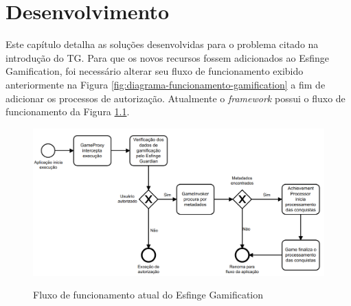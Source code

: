 \newpage
\chapter{Desenvolvimento}
\label{ch:desenvolvimento}




\par Este capítulo detalha as soluções desenvolvidas para o problema citado na introdução do TG. Para que os novos recursos fossem adicionados ao Esfinge Gamification, foi necessário alterar seu fluxo de funcionamento exibido anteriormente na Figura \ref{fig:diagrama-funcionamento-gamification} a fim de adicionar os processos de autorização. Atualmente o \textit{framework} possui o fluxo de funcionamento da Figura \ref{fig:fluxo-atual}. 

\begin{figure}[H]
    \centering
    \caption{Fluxo de funcionamento atual do Esfinge Gamification}
    \includegraphics[scale=0.3]{src/imagens/cap3/fluxo-atual.png}
    \label{fig:fluxo-atual}
\end{figure}

